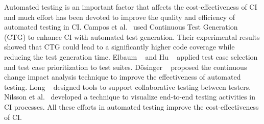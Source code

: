 

Automated testing is an important factor that affects the cost-effectiveness 
of CI and much effort has been devoted to improve the quality and 
efficiency of automated testing in CI. 
Campos et al.~\cite{campos2014continuous} used Continuous Test Generation 
(CTG) to enhance CI with automated test generation. 
Their experimental results showed that CTG could lead to a significantly 
higher code coverage while reducing the test generation time. 
Elbaum \etal~\cite{elbaum2014techniques} and Hu 
\etal~\cite{hu2016Implementation} applied test case selection and test case 
prioritization to test suites. %
D{\"o}singer \etal~\cite{dosinger2012communicating} proposed the continuous 
change impact analysis technique 
to improve the effectiveness of automated testing. 
Long \etal~\cite{long2015collaborative} designed tools to support collaborative 
testing between testers. 
Nilsson et al.~\cite{nilsson2014visualizing} developed a technique to visualize 
end-to-end testing activities in CI processes. 
All these efforts in automated testing improve the cost-effectiveness of CI. 

 
